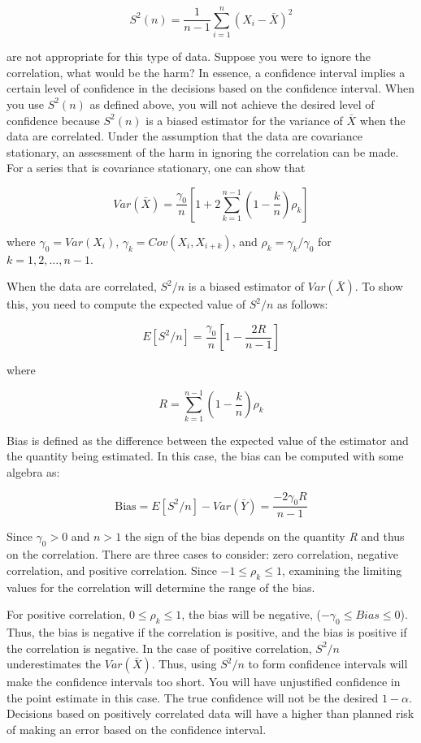 \documentclass[
]{book}
\theoremstyle{definition}
\theoremstyle{definition}
\theoremstyle{definition}
\theoremstyle{definition}
\theoremstyle{remark}
\begin{document}
\[S^2(n) = \dfrac{1}{n - 1}\sum_{i=1}^n (X_i - \bar{X})^2\]

are not appropriate for this type of data. Suppose you were to ignore
the correlation, what would be the harm? In essence, a confidence
interval implies a certain level of confidence in the decisions based on
the confidence interval. When you use \(S^2(n)\) as defined above, you
will not achieve the desired level of confidence because \(S^2(n)\) is a
biased estimator for the variance of \(\bar{X}\) when the data are
correlated. Under the assumption that the data are covariance
stationary, an assessment of the harm in ignoring the correlation can be
made. For a series that is covariance stationary, one can show that

\[Var(\bar{X}) = \dfrac{\gamma_0}{n} \left[1 + 2 \sum_{k=1}^{n-1} \left(1 - \dfrac{k}{n} \right) \rho_k \right]\]

where \(\gamma_0 = Var(X_i)\), \(\gamma_k = Cov(X_i, X_{i + k})\), and
\(\rho_k = \gamma_k/\gamma_0\) for \(k = 1, 2, \ldots, n - 1\).

When the data are correlated, \(S^2/n\) is a biased estimator of
\(Var(\bar{X})\). To show this, you need to compute the expected value of
\(S^2/n\) as follows:

\[E\left[S^2/n\right] = \dfrac{\gamma_0}{n} \left[1 - \dfrac{2R}{n - 1}\right]\]

where

\[R = \sum_{k=1}^{n-1} (1 - \dfrac{k}{n}) \rho_k\]

Bias is defined as the difference between the expected value of the
estimator and the quantity being estimated. In this case, the bias can
be computed with some algebra as:

\[\text{Bias} = E\left[S^2/n\right] - Var(\bar{Y}) = \dfrac{-2 \gamma_0 R}{n - 1}\]

Since \(\gamma_0 > 0\) and \(n > 1\) the sign of the bias depends on the
quantity \emph{R} and thus on the correlation. There are three cases to
consider: zero correlation, negative correlation, and positive
correlation. Since \(-1 \leq \rho_k \leq 1\), examining the limiting
values for the correlation will determine the range of the bias.

For positive correlation, \(0 \leq \rho_k \leq 1\), the bias will be
negative, (\(- \gamma_0 \leq Bias \leq 0\)). Thus, the bias is negative if
the correlation is positive, and the bias is positive if the correlation
is negative. In the case of positive correlation, \(S^2/n\) underestimates
the \(Var(\bar{X})\). Thus, using \(S^2/n\) to form confidence intervals
will make the confidence intervals too short. You will have unjustified
confidence in the point estimate in this case. The true confidence will
not be the desired \(1 - \alpha\). Decisions based on positively
correlated data will have a higher than planned risk of making an error
based on the confidence interval.
\end{document}
